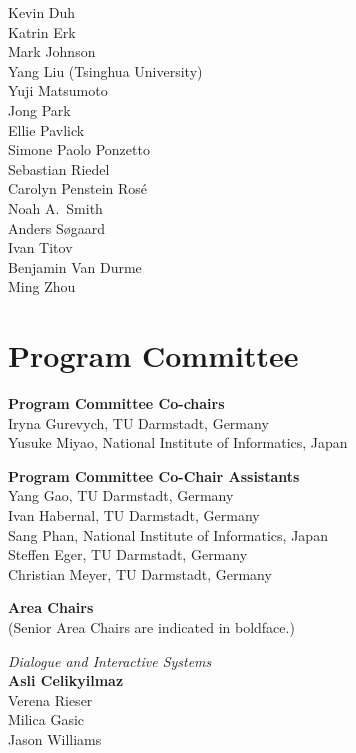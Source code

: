 Kevin	Duh \\
Katrin	Erk \\
Mark	Johnson \\
Yang	Liu (Tsinghua University)\\
Yuji	Matsumoto \\
Jong	Park \\
Ellie	Pavlick \\
Simone Paolo	Ponzetto \\
Sebastian	Riedel \\
Carolyn	Penstein Rosé \\
Noah A.~Smith \\
Anders	Søgaard \\
Ivan	Titov \\
Benjamin	Van Durme \\
Ming	Zhou


\clearpage
\section{Program Committee}
\setlength{\parindent}{0pt}

{\bf Program Committee Co-chairs} \\
Iryna Gurevych, TU Darmstadt, Germany \\
Yusuke Miyao, National Institute of Informatics, Japan

{\bf Program Committee Co-Chair Assistants} \\
Yang Gao, TU Darmstadt, Germany \\
Ivan Habernal, TU Darmstadt, Germany \\
Sang Phan, National Institute of Informatics, Japan \\
Steffen Eger, TU Darmstadt, Germany \\
Christian Meyer, TU Darmstadt, Germany

{\bf Area Chairs} \\
(Senior Area Chairs are indicated in boldface.)

\emph{Dialogue and Interactive Systems} \\
\hspace*{5mm}\textbf{Asli Celikyilmaz} \\
\hspace*{5mm}Verena Rieser \\
\hspace*{5mm}Milica Gasic \\
\hspace*{5mm}Jason Williams

